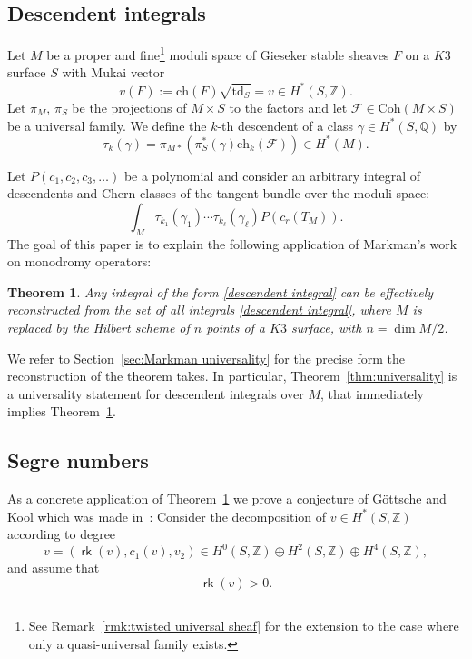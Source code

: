 \documentclass[pdftex]{sigma}
\numberwithin{equation}{section}
\newtheorem{thm}[Theorem]{Theorem}
\newcommand{\BQ}{{\mathbb{Q}}}
\newcommand{\BZ}{{\mathbb{Z}}}
\newcommand{\CF}{{\mathcal F}}
\newcommand{\ch}{{\mathrm{ch}}}
\newcommand{\td}{{\mathrm{td}}}
\newcommand{\Coh}{\mathrm{Coh}}
\newcommand{\1}{\mathsf{1}}
\newcommand\rk{\operatorname{\mathsf{rk}}}
\begin{document}
\subsection{Descendent integrals}
Let $M$ be a proper and fine\footnote{See Remark~\ref{rmk:twisted universal sheaf} for the extension to the case where only a quasi-universal family exists.}
moduli space of Gieseker stable sheaves $F$ on a $K3$ surface $S$ with Mukai vector
\[
v(F) := \ch(F) \sqrt{\td_S} = v \in H^{\ast}(S,\BZ).
\]
Let $\pi_{M}$, $\pi_S$ be the projections of  $M \times S$ to the factors
and let $\CF \in \Coh(M \times S)$ be a universal family.
We define the $k$-th descendent of a class $\gamma \in H^{\ast}(S,\BQ)$ by
\begin{equation}
\tau_k(\gamma) = \pi_{M \ast}(\pi_S^{\ast}(\gamma) \ch_k(\CF)) \in H^{\ast}(M).
\label{defn descendent}
\end{equation}

Let $P(c_1, c_2, c_3, \dots )$ be a polynomial and consider
an arbitrary integral of descendents and Chern classes of the tangent bundle over the moduli space:
\begin{equation} \label{descendent integral}
\int_{M} \tau_{k_1}(\gamma_1) \cdots \tau_{k_{\ell}}(\gamma_{\ell}) P(c_r(T_{M})).
\end{equation}
The goal of this paper is to explain the following application of
Markman's work~\cite{Markman} on monodromy operators:
\begin{thm}
\label{thm:intro main}
Any integral of the form \eqref{descendent integral}
 can be effectively reconstructed from the set of all integrals \eqref{descendent integral}, where $M$ is replaced by the Hilbert scheme of $n$ points of a $K3$ surface, with $n=\dim M/2$.
\end{thm}

We refer to Section~\ref{sec:Markman universality} for the precise form the reconstruction of the theorem takes.
In particular, Theorem~\ref{thm:universality} is a universality statement for descendent integrals over $M$, that immediately implies Theorem~\ref{thm:intro main}.

\subsection{Segre numbers}
As a concrete application of Theorem~\ref{thm:intro main}
we prove a conjecture of G\"ottsche and Kool
which was made in~\cite[Conjecture~5.1]{GK}:
Consider the decomposition of $v \in H^{\ast}(S,\BZ)$ according to degree
\[
v = (\rk(v), c_1(v), v_2) \in H^0(S,\BZ) \oplus H^2(S,\BZ) \oplus H^4(S,\BZ),
\]
and assume that
\[
\rk(v) > 0.
\]
\end{document}

